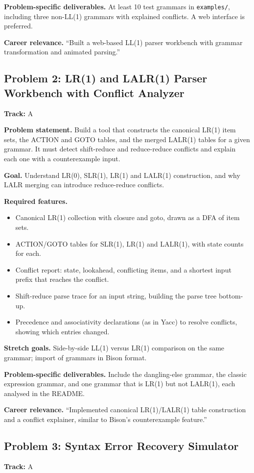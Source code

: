 \documentclass[11pt,a4paper]{article}
\newcommand{\fld}[1]{\par\smallskip\textbf{\color{accent}#1}\quad}
\newcommand{\meta}[1]{%
  \begin{tcolorbox}[colback=softbg,colframe=softbg,boxsep=2pt,left=4pt,right=4pt,top=2pt,bottom=2pt,arc=2pt]
  \small\textbf{Track:} #1
  \end{tcolorbox}}
\begin{document}
\fld{Problem-specific deliverables.} At least 10 test grammars in \texttt{examples/}, including three
non-LL(1) grammars with explained conflicts. A web interface is preferred.

\fld{Career relevance.} ``Built a web-based LL(1) parser workbench with grammar transformation and animated parsing.''

\subsection{Problem 2: LR(1) and LALR(1) Parser Workbench with Conflict Analyzer}
\meta{A}

\fld{Problem statement.} Build a tool that constructs the canonical LR(1) item sets, the ACTION and
GOTO tables, and the merged LALR(1) tables for a given grammar. It must detect shift-reduce and
reduce-reduce conflicts and explain each one with a counterexample input.

\fld{Goal.} Understand LR(0), SLR(1), LR(1) and LALR(1) construction, and why LALR merging can
introduce reduce-reduce conflicts.

\fld{Required features.}
\begin{itemize}
  \item Canonical LR(1) collection with closure and goto, drawn as a DFA of item sets.
  \item ACTION/GOTO tables for SLR(1), LR(1) and LALR(1), with state counts for each.
  \item Conflict report: state, lookahead, conflicting items, and a shortest input prefix that reaches the conflict.
  \item Shift-reduce parse trace for an input string, building the parse tree bottom-up.
  \item Precedence and associativity declarations (as in Yacc) to resolve conflicts, showing which entries changed.
\end{itemize}

\fld{Stretch goals.} Side-by-side LL(1) versus LR(1) comparison on the same grammar; import of grammars in Bison format.

\fld{Problem-specific deliverables.} Include the dangling-else grammar, the classic expression grammar,
and one grammar that is LR(1) but not LALR(1), each analysed in the README.

\fld{Career relevance.} ``Implemented canonical LR(1)/LALR(1) table construction and a conflict explainer, similar to Bison's counterexample feature.''

\subsection{Problem 3: Syntax Error Recovery Simulator}
\meta{A}
\end{document}
